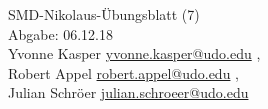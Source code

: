 


\begin{center}
{\huge SMD-Nikolaus-Übungsblatt (7) } \\
\vspace{1cm}
Abgabe: 06.12.18 \\
\vspace{.5cm}
  Yvonne Kasper
  \texorpdfstring{
    \href{mailto:authorA@udo.edu}{yvonne.kasper@udo.edu}
  }{},\\
  Robert Appel%
  \texorpdfstring{
    \href{mailto:authorB@udo.edu}{robert.appel@udo.edu}
  }{},\\
  Julian Schröer%
  \texorpdfstring{
    \href{mailto:authorB@udo.edu}{julian.schroeer@udo.edu}
  }{}
\end{center}
%


%

\printbibliography


